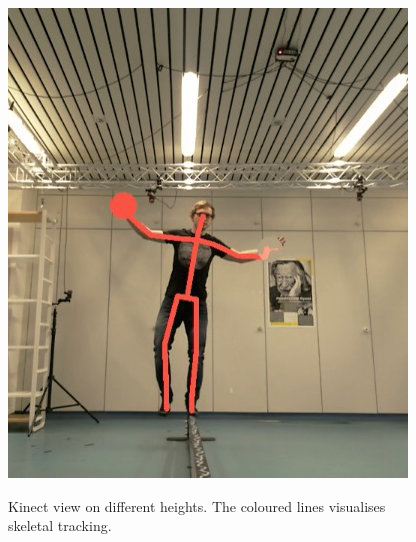 \begin{figure}[htb]
\begin{minipage}[t]{0.32\linewidth}
		\label{fig:5_3_kinectHeightMiddle}
	\end{minipage}
	\hfill
	\begin{minipage}[t]{0.32\linewidth}
		\centering
		\includegraphics[width=1\linewidth]{Pictures/5_3_kinectHeightLow}
		\label{fig:5_3_kinectHeightLow}
	\end{minipage}
	\caption{Kinect view on different heights. The coloured lines visualises skeletal tracking.}
	\label{fig:5_3_kinectHeights}
\end{figure}

